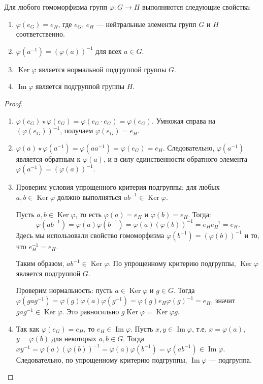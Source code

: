 \documentclass[10pt]{article}
\begin{document}
\begin{stat}
Для любого гомоморфизма групп $\varphi: G \to H$ выполняются следующие свойства:
\begin{enumerate}
    \item $\varphi(e_G) = e_H$, где $e_G$, $e_H$ — нейтральные элементы групп $G$ и $H$ соответственно.
    \item $\varphi(a^{-1}) = (\varphi(a))^{-1}$ для всех $a \in G$.
    \item $\operatorname{Ker}\varphi$ является нормальной подгруппой группы $G$.
    \item $\operatorname{Im}\varphi$ является подгруппой группы $H$.
\end{enumerate}
\end{stat}
\begin{proof}
\begin{enumerate}
    \item $\varphi(e_G) \star \varphi(e_G) = \varphi(e_G \cdot e_G) = \varphi(e_G)$. Умножая справа на $(\varphi(e_G))^{-1}$, получаем $\varphi(e_G) = e_H$.
    \item $\varphi(a) \star \varphi(a^{-1}) = \varphi(a a^{-1}) = \varphi(e_G) = e_H$. Следовательно, $\varphi(a^{-1})$ является обратным к $\varphi(a)$, и в силу единственности обратного элемента $\varphi(a^{-1}) = (\varphi(a))^{-1}$.
    \item Проверим условия упрощенного критерия подгруппы: для любых $a, b \in \operatorname{Ker}\varphi$ должно выполняться $ab^{-1} \in \operatorname{Ker}\varphi$.

Пусть $a, b \in \operatorname{Ker}\varphi$, то есть $\varphi(a) = e_H$ и $\varphi(b) = e_H$. Тогда:
\[
\varphi(ab^{-1}) = \varphi(a)\varphi(b^{-1}) = \varphi(a)(\varphi(b))^{-1} = e_H e_H^{-1} = e_H.
\]
Здесь мы использовали свойство гомоморфизма $\varphi(b^{-1}) = (\varphi(b))^{-1}$ и то, что $e_H^{-1} = e_H$.

Таким образом, $ab^{-1} \in \operatorname{Ker}\varphi$. По упрощенному критерию подгруппы, $\operatorname{Ker}\varphi$ является подгруппой $G$.

Проверим нормальность: пусть $a \in \operatorname{Ker}\varphi$ и $g \in G$. Тогда $\varphi(g a g^{-1}) = \varphi(g)\varphi(a)\varphi(g^{-1}) = \varphi(g) e_H \varphi(g)^{-1} = e_H$, значит $g a g^{-1} \in \operatorname{Ker}\varphi$. Это равносильно $g \operatorname{Ker}\varphi = \operatorname{Ker}\varphi g$.
    \item Так как $\varphi(e_G)=e_H$, то $e_H \in \operatorname{Im}\varphi$. Пусть $x,y \in \operatorname{Im}\varphi$, т.е. $x=\varphi(a)$, $y=\varphi(b)$ для некоторых $a,b \in G$. Тогда $xy^{-1} = \varphi(a)(\varphi(b))^{-1} = \varphi(a)\varphi(b^{-1}) = \varphi(ab^{-1}) \in \operatorname{Im}\varphi$. Следовательно, по упрощенному критерию подгруппы, $\operatorname{Im}\varphi$ — подгруппа.
\end{enumerate}
\end{proof}
\end{document}
